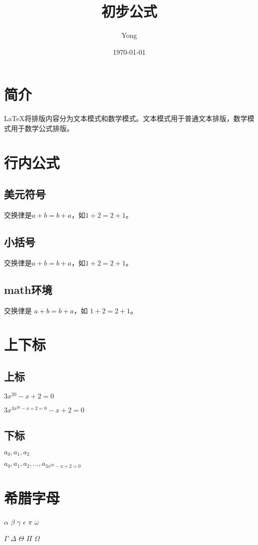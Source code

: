 \documentclass{article}
\title{初步公式}
\author{Yong}
\date{\today}
\begin{document}
	\maketitle
	\tableofcontents
	\section{简介}
	 \LaTeX{}将排版内容分为文本模式和数学模式。文本模式用于普通文本排版，数学模式用于数学公式排版。
	\section{行内公式}
	\subsection{美元符号}
	交换律是$a+b=b+a$，如$1+2=2+1$。
	\subsection{小括号}
	交换律是\(a+b=b+a\)，如\(1+2=2+1\)。
	\subsection{math环境}
	交换律是 \begin{math}a+b=b+a\end{math}，如 \begin{math}1+2=2+1\end{math}。
	\section{上下标}
	\subsection{上标}
	$3x^{20} - x + 2 = 0$
	
	$3x^{3x^{20} - x + 2 = 0} - x + 2 = 0$
	\subsection{下标}
	$a_0, a_1, a_2 $
	
	$a_0, a_1, a_2, ..., a_{3x^{20} - x + 2 = 0} $
	\section{希腊字母}
	$\alpha$
	$\beta$
	$\gamma$
	$\epsilon$
	$\pi$
	$\omega$
	
	$\Gamma$
	$\Delta$
	$\Theta$
	$\Pi$
	$\Omega$
	
\end{document}
